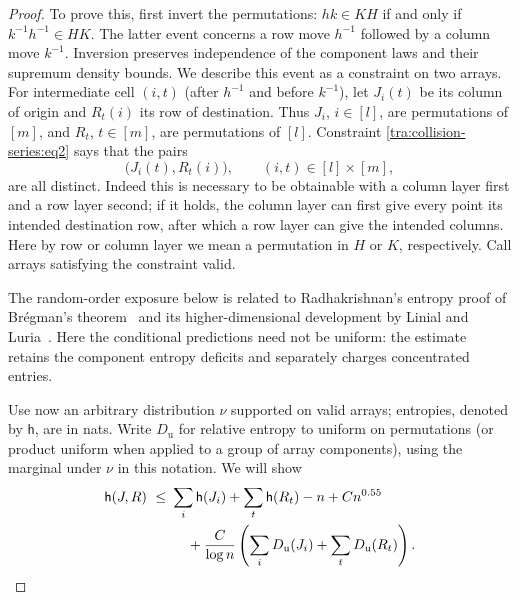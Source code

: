 \begin{proof}\label{tra:collision-series:compatibility-proof}
\label{tra:collision-series:bundle-packing-and-entropy}
To prove this, first invert the permutations: \(hk\in KH\) if and only if \(k^{-1}h^{-1}\in HK\). The latter event concerns a row move \(h^{-1}\) followed by a column move \(k^{-1}\). Inversion preserves independence of the component laws and their supremum density bounds. We describe this event as a constraint on two arrays. For intermediate cell \((i,t)\) (after \(h^{-1}\) and before \(k^{-1}\)), let \(J_i(t)\) be its column of origin and \(R_t(i)\) its row of destination. Thus \(J_i\), \(i\in[l]\), are permutations of \([m]\), and \(R_t\), \(t\in[m]\), are permutations of \([l]\). Constraint \eqref{tra:collision-series:eq2} says that the pairs
\[
\big(J_i(t),R_t(i)\big),\qquad (i,t)\in[l]\times[m],
\]
are all distinct. Indeed this is necessary to be obtainable with a column layer first and a row layer second; if it holds, the column layer can first give every point its intended destination row, after which a row layer can give the intended columns. Here by row or column layer we mean a permutation in \(H\) or \(K\), respectively. Call arrays satisfying the constraint valid.

The random-order exposure below is related to Radhakrishnan's entropy proof of Br\'egman's theorem~\cite{Radhakrishnan1997} and its higher-dimensional development by Linial and Luria~\cite[Sections~2.2--3.2]{LinialLuria2014}. Here the conditional predictions need not be uniform: the estimate retains the component entropy deficits and separately charges concentrated entries.

Use now an arbitrary distribution \(\nu\) supported on valid arrays; entropies, denoted by \(\mathsf h\), are in nats. Write \(D_\mathrm{u}\) for relative entropy to uniform on permutations (or product uniform when applied to a group of array components), using the marginal under \(\nu\) in this notation. We will show
\begin{equation}
\begin{split}
\mathsf h(J,R) \ \le\ 
 &\sum_i\mathsf h(J_i)+\sum_t\mathsf h(R_t)
 - n+C n^{0.55}\\
 &\hspace{4mm}+\frac{C}{\log n}\left(\sum_i D_\mathrm{u}(J_i)+\sum_t D_\mathrm{u}(R_t)\right). 
\end{split}\label{tra:collision-series:eq4}
\end{equation}


\end{proof}
